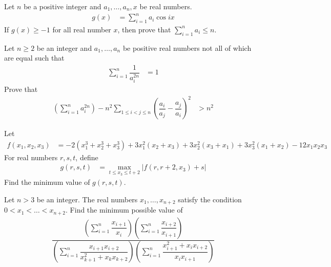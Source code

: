 \documentclass{subfile}
\begin{document}
		\begin{problem}
			Let $n$ be a positive integer and $a_{1},\ldots,a_{n},x$ be real numbers.
				\begin{align*}
					g(x)
						& = \sum_{i=1}^{n}a_{i}\cos{ix}
				\end{align*}
			If $g(x)\geq -1$ for all real number $x$, then prove that $\sum_{i=1}^{n}a_{i}\leq n$.
		\end{problem}
	
		\begin{problem}
			Let $n\geq 2$ be an integer and $a_{1},\ldots,a_{n}$ be positive real numbers not all of which are equal such that
				\begin{align*}
					\sum_{i=1}^{n}\dfrac{1}{a_{i}^{2n}}
						& = 1
				\end{align*}
			Prove that
				\begin{align*}
					\left(\sum_{i=1}^{n}a_{i}^{2n}\right)-n^{2}\sum_{1\leq i < j\leq n}\left(\dfrac{a_{i}}{a_{j}}-\dfrac{a_{j}}{a_{i}}\right)^{2}
						& > n^{2}
				\end{align*}
		\end{problem}
	
		\begin{problem}
			Let
				\begin{align*}
					f(x_{1},x_{2},x_{3})	
						& = -2(x_{1}^{3}+x_{2}^{3}+x_{3}^{3})+3x_{1}^{2}(x_{2}+x_{3})+3x_{2}^{2}(x_{3}+x_{1})+3x_{3}^{2}(x_{1}+x_{2})-12x_{1}x_{2}x_{3}
				\end{align*}
			For real numbers $r,s,t$, define
				\begin{align*}
					g(r,s,t)
						& = \max\limits_{t\leq x_{3}\leq t+2}|f(r, r+2, x_{3})+s|
				\end{align*}
			Find the minimum value of $g(r,s,t)$.
		\end{problem}
	
		\begin{problem}
			Let $n>3$ be an integer. The real numbers $x_{1},\ldots,x_{n+2}$ satisfy the condition $0<x_{1}<\ldots<x_{n+2}$. Find the minimum possible value of
				\begin{align*}
					\dfrac{\left(\sum_{i=1}^{n}\dfrac{x_{i+1}}{x_{i}}\right)\left(\sum_{i=1}^{n}\dfrac{x_{i+2}}{x_{i+1}}\right)}{\left(\sum_{i=1}^{n}\dfrac{x_{i+1}x_{i+2}}{x_{k+1}^{2}+x_{k}x_{k+2}}\right)\left(\sum_{i=1}^{n}\dfrac{x_{i+1}^{2}+x_{i}x_{i+2}}{x_{i}x_{i+1}}\right)}
				\end{align*}
		\end{problem}
	
\end{document}
